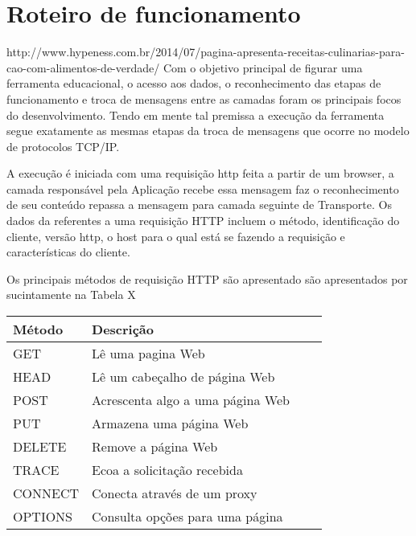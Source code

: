
\chapter{Roteiro de funcionamento}
http://www.hypeness.com.br/2014/07/pagina-apresenta-receitas-culinarias-para-cao-com-alimentos-de-verdade/
Com o objetivo principal de figurar uma ferramenta educacional, o acesso aos dados, o reconhecimento das etapas de funcionamento e troca de mensagens entre as camadas foram os principais focos do desenvolvimento. Tendo em mente tal premissa a execução da ferramenta segue exatamente as mesmas etapas da troca de mensagens que ocorre no modelo de protocolos TCP/IP.

A execuç\~ao \'e iniciada com uma requisiç\~ao http feita a partir de um browser, a camada responsável pela Aplicação recebe essa mensagem faz o reconhecimento de seu conteúdo repassa a mensagem para camada seguinte de Transporte. Os dados da referentes a uma requisição HTTP incluem o método, identificação do cliente, versão http, o host para o qual está se fazendo a requisição e características do cliente.

Os principais métodos de requisição HTTP são apresentado são apresentados por  sucintamente na Tabela X

\begin{tabular}{ |p{3cm}||p{3cm}|p{3cm}|p{3cm}|  }
	\hline
	Método & Descrição\\
	\hline
	GET   	& Lê uma pagina Web\\
	HEAD	& Lê um cabeçalho de página Web\\
	POST 	& Acrescenta algo a uma página Web\\
	PUT    	& Armazena uma página Web\\
	DELETE	& Remove a página Web\\
	TRACE	& Ecoa a solicitação recebida\\
	CONNECT & Conecta através de um proxy\\
	OPTIONS & Consulta opções para uma página\\
	\hline
\end{tabular}
	 